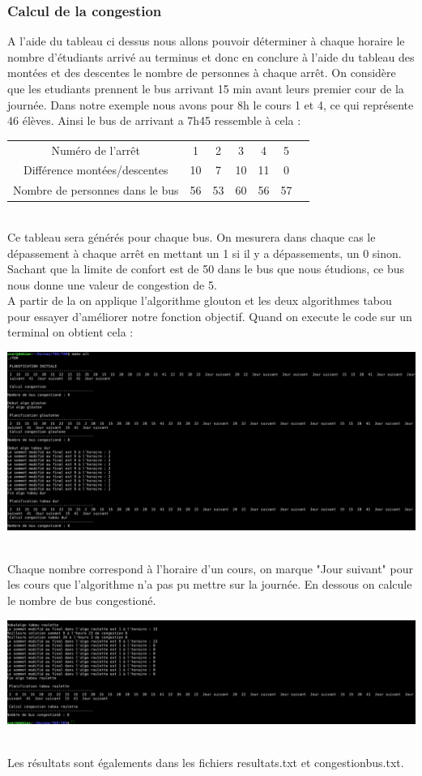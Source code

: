 \documentclass[a4paper,11pt]{article}
\begin{document}
		\subsubsection{Calcul de la congestion}
			A l'aide du tableau ci dessus nous allons pouvoir déterminer à chaque horaire le nombre d'étudiants arrivé au terminus et donc en conclure à l'aide du tableau des montées et des descentes le nombre de personnes à chaque arrêt. 
			On considère que les etudiants prennent le bus arrivant 15 min avant leurs premier cour de la journée.
			Dans notre exemple nous avons pour  8h le cours 1 et 4, ce qui représente 46 élèves. Ainsi le bus de arrivant a 7h45 ressemble à cela :  \\
			\begin{tabular}{ | c | c | c | c | c | c | c |}
 				\hline			
   				Numéro de l'arrêt & 1 & 2 & 3 & 4 & 5\\
   				Différence montées/descentes & 10 & 7 & 10 & 11 & 0\\
   				Nombre de personnes dans le bus & 56 & 53 & 60 & 56 & 57\\
 				\hline  
 			\end{tabular}\\
 			Ce tableau sera générés pour chaque bus. On mesurera dans chaque cas le dépassement à chaque arrêt en mettant un 1 si il y a dépassements, un 0 sinon.
 			Sachant que la limite de confort est de 50 dans le bus que nous étudions, ce bus nous donne une valeur de congestion de 5.\\
 			A partir de la on applique l'algorithme glouton et les deux algorithmes tabou pour essayer d'améliorer notre fonction objectif.
 			Quand on execute le code sur un terminal on obtient cela : \\
 			\centerline{\includegraphics[scale=0.5]{Captures/terminal1.png}}\\
 			Chaque nombre correspond à l'horaire d'un cours, on marque "Jour suivant" pour les cours que l'algorithme n'a pas pu mettre sur la journée.
 			En dessous on calcule le nombre de bus congestioné. 
 			\centerline{\includegraphics[scale=0.5]{Captures/terminal2.png}}\\
 			Les résultats sont égalements dans les fichiers resultats.txt et congestionbus.txt.
\end{document}
